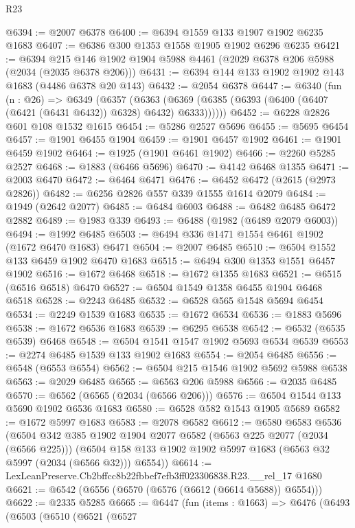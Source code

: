 \begin{lexlean}{R23}
\begin{coremodule}
@6394 := @2007 @6378
@6400 := @6394 @1559 @133 @1907 @1902 @6235 @1683
@6407 := @6386 @300 @1353 @1558 @1905 @1902 @6296 @6235
@6421 := @6394 @215 @146 @1902 @1904 @5988 @4461 (@2029 @6378 @206 @5988 (@2034 (@2035 @6378 @206)))
@6431 := @6394 @144 @133 @1902 @1902 @143 @1683 (@4486 @6378 @20 @143)
@6432 := @2054 @6378
@6447 := @6340
    (fun (n : @26) =>
    @6349
      (@6357
        (@6363 (@6369 (@6385 (@6393 (@6400 (@6407 (@6421 (@6431 @6432)) @6328) @6432) @6333))))))
@6452 := @6228 @2826 @601 @108 @1532 @1615
@6454 := @5286 @2527 @5696
@6455 := @5695 @6454
@6457 := @1901 @6455 @1904
@6459 := @1901 @6457 @1902
@6461 := @1901 @6459 @1902
@6464 := @1925 (@1901 @6461 @1902)
@6466 := @2260 @5285 @2527
@6468 := @1883 (@6466 @5696)
@6470 := @4142 @6468 @1355
@6471 := @2003 @6470
@6472 := @6464 @6471
@6476 := @6452 @6472 (@2615 (@2973 @2826))
@6482 := @6256 @2826 @557 @339 @1555 @1614 @2079
@6484 := @1949 (@2642 @2077)
@6485 := @6484 @6003
@6488 := @6482 @6485 @6472 @2882
@6489 := @1983 @339
@6493 := @6488 (@1982 (@6489 @2079 @6003))
@6494 := @1992 @6485
@6503 := @6494 @336 @1471 @1554 @6461 @1902 (@1672 @6470 @1683) @6471
@6504 := @2007 @6485
@6510 := @6504 @1552 @133 @6459 @1902 @6470 @1683
@6515 := @6494 @300 @1353 @1551 @6457 @1902
@6516 := @1672 @6468
@6518 := @1672 @1355 @1683
@6521 := @6515 (@6516 @6518) @6470
@6527 := @6504 @1549 @1358 @6455 @1904 @6468 @6518
@6528 := @2243 @6485
@6532 := @6528 @565 @1548 @5694 @6454
@6534 := @2249 @1539 @1683
@6535 := @1672 @6534
@6536 := @1883 @5696
@6538 := @1672 @6536 @1683
@6539 := @6295 @6538
@6542 := @6532 (@6535 @6539) @6468
@6548 := @6504 @1541 @1547 @1902 @5693 @6534 @6539
@6553 := @2274 @6485 @1539 @133 @1902 @1683
@6554 := @2054 @6485
@6556 := @6548 (@6553 @6554)
@6562 := @6504 @215 @1546 @1902 @5692 @5988 @6538
@6563 := @2029 @6485
@6565 := @6563 @206 @5988
@6566 := @2035 @6485
@6570 := @6562 (@6565 (@2034 (@6566 @206)))
@6576 := @6504 @1544 @133 @5690 @1902 @6536 @1683
@6580 := @6528 @582 @1543 @1905 @5689
@6582 := @1672 @5997 @1683
@6583 := @2078 @6582
@6612 := @6580
    @6583
    @6536
    (@6504
      @342
      @385
      @1902
      @1904
      @2077
      @6582
      (@6563 @225 @2077 (@2034 (@6566 @225)))
      (@6504 @158 @133 @1902 @1902 @5997 @1683 (@6563 @32 @5997 (@2034 (@6566 @32))) @6554))
@6614 := LexLeanPreserve.Cb2bffcc8b22fbbef7efb3ff023306838.R23.__rel_17 @1680
@6621 := @6542 (@6556 (@6570 (@6576 (@6612 (@6614 @5688)) @6554)))
@6622 := @2335 @5285
@6665 := @6447
    (fun (items : @1663) =>
    @6476
      (@6493
        (@6503
          (@6510
            (@6521
              (@6527

\end{coremodule}
\end{lexlean}
